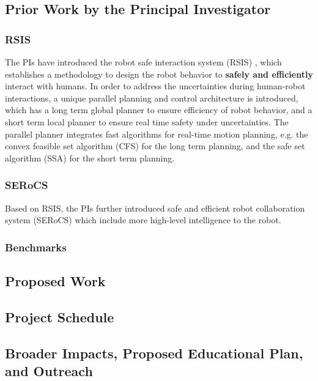 \subsection{Prior Work by the Principal Investigator}



\subsubsection{RSIS}
The PIs have introduced the robot safe interaction system (RSIS) \cite{liu2018robot}, which establishes a methodology to design the robot behavior to \textbf{safely and efficiently} interact with humans. In order to address the uncertainties during human-robot interactions, a unique parallel planning and control architecture is introduced, which has a long term global planner to ensure efficiency of robot behavior, and a short term local planner to ensure real time safety under uncertainties. The parallel planner integrates fast algorithms for real-time motion planning, e.g. the convex feasible set algorithm (CFS) \cite{liu2017sicon} for the long term planning, and the safe set algorithm (SSA) \cite{liu2014control} for the short term planning. 


\subsubsection{SERoCS}
Based on RSIS, the PIs further introduced safe and efficient robot collaboration system (SERoCS) which include more high-level intelligence to the robot.
\subsubsection{Benchmarks}

\subsection{Proposed Work}







\subsection{Project Schedule}





\subsection{Broader Impacts, Proposed Educational Plan, and Outreach}

